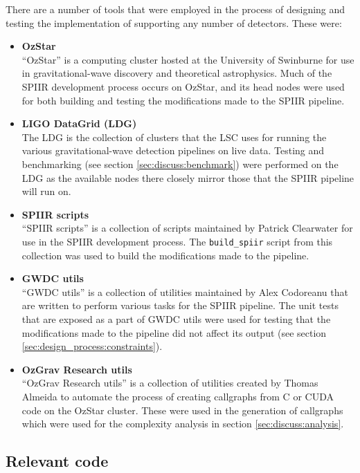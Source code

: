 \documentclass{article}
\begin{document}
There are a number of tools that were employed in the process of designing and testing the implementation of supporting any number of detectors.
These were:
\begin{itemize}
    \item \textbf{OzStar \cite{ozstar}}\\
        ``OzStar'' is a computing cluster hosted at the University of Swinburne for use in gravitational-wave discovery and theoretical astrophysics.
        Much of the SPIIR development process occurs on OzStar, and its head nodes were used for both building and testing the modifications made to the SPIIR pipeline.
    \item \textbf{LIGO DataGrid (LDG) \cite{ldg}}\\
        The LDG is the collection of clusters that the LSC uses for running the various gravitational-wave detection pipelines on live data.
        Testing and benchmarking (see section \ref{sec:discuss:benchmark}) were performed on the LDG as the available nodes there closely mirror those that the SPIIR pipeline will run on.
    \item \textbf{SPIIR scripts \cite{build_spiir}}\\
        ``SPIIR scripts'' is a collection of scripts maintained by Patrick Clearwater for use in the SPIIR development process.
        The \texttt{build\_spiir} script from this collection was used to build the modifications made to the pipeline.
    \item \textbf{GWDC utils \cite{gwdc_utils}}\\
        ``GWDC utils'' is a collection of utilities maintained by Alex Codoreanu that are written to perform various tasks for the SPIIR pipeline.
        The unit tests that are exposed as a part of GWDC utils were used for testing that the modifications made to the pipeline did not affect its output (see section \ref{sec:design_process:constraints}).
    \item \textbf{OzGrav Research utils \cite[\texttt{utils/}]{ozgrav_research}}\\
        ``OzGrav Research utils'' is a collection of utilities created by Thomas Almeida to automate the process of creating callgraphs from C or CUDA code on the OzStar cluster.
        These were used in the generation of callgraphs which were used for the complexity analysis in section \ref{sec:discuss:analysis}.
\end{itemize}

\subsection{Relevant code} \label{sec:design_process:code}
\end{document}
